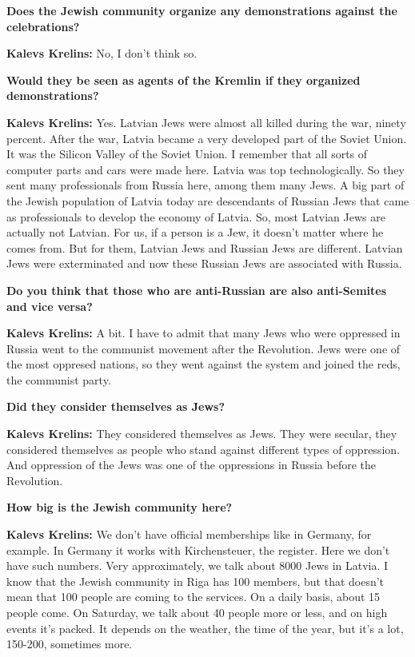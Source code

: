 \textbf{Does the Jewish community organize any demonstrations against the celebrations?} 

\textbf{Kalevs Krelins:} No, I don’t think so.  

\textbf{Would they be seen as agents of the Kremlin if they organized demonstrations?} 

\textbf{Kalevs Krelins:} Yes. Latvian Jews were almost all killed during the war, ninety percent. After the war, Latvia became a very developed part of the Soviet Union. It was the Silicon Valley of the Soviet Union. I remember that all sorts of computer parts and cars were made here. Latvia was top technologically. So they sent many professionals from Russia here, among them many Jews. A big part of the Jewish population of Latvia today are descendants of Russian Jews that came as professionals to develop the economy of Latvia. So, most Latvian Jews are actually not Latvian. For us, if a person is a Jew, it doesn’t matter where he comes from. But for them, Latvian Jews and Russian Jews are different. Latvian Jews were exterminated and now these Russian Jews are associated with Russia.  

\textbf{Do you think that those who are anti-Russian are also anti-Semites and vice versa?} 

\textbf{Kalevs Krelins:} A bit. I have to admit that many Jews who were oppressed in Russia went to the communist movement after the Revolution. Jews were one of the most oppresed nations, so they went against the system and joined the reds, the communist party. 

\textbf{Did they consider themselves as Jews?} 

\textbf{Kalevs Krelins:} They considered themselves as Jews. They were secular, they considered themselves as people who stand against different types of oppression. And oppression of the Jews was one of the oppressions in Russia before the Revolution.   

\textbf{How big is the Jewish community here?} 

\textbf{Kalevs Krelins:} We don’t have official memberships like in Germany, for example. In Germany it works with Kirchensteuer, the register. Here we don’t have such numbers. Very approximately, we talk about 8000 Jews in Latvia. I know that the Jewish community in Riga has 100 members, but that doesn’t mean that 100 people are coming to the services. On a daily basis, about 15 people come. On Saturday, we talk about 40 people more or less, and on high events it’s packed. It depends on the weather, the time of the year, but it’s a lot, 150-200, sometimes more.  

